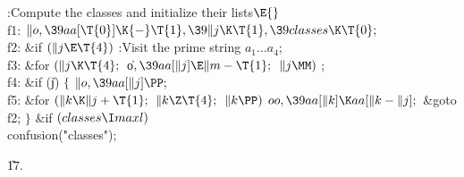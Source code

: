\Y\B\4:Compute the classes and initialize their lists\X${}\E{}$\6
\4\\{f1}:\5
${}\|o,\39\\{aa}[\T{0}]\K{-}\T{1},\39\|j\K\T{1},\39\\{classes}\K\T{0};{}$\6
\4\\{f2}:\5
\&{if} ${}(\|j\E\T{4}){}$\1\5
:Visit the prime string $a_1\ldots a_4$\X;\2\6
\4\\{f3}:\5
\&{for} ${}(\|j\K\T{4};{}$ \|o${},\39\\{aa}[\|j]\E\|m-\T{1};{}$ ${}\|j\MM){}$\1%
\5
;\2\6
\4\\{f4}:\5
\&{if} (\|j)\5
${}\{{}$\1\6
${}\|o,\39\\{aa}[\|j]\PP;{}$\6
\4\\{f5}:\5
\&{for} ${}(\|k\K\|j+\T{1};{}$ ${}\|k\Z\T{4};{}$ ${}\|k\PP){}$\1\5
${}\\{oo},\39\\{aa}[\|k]\K\\{aa}[\|k-\|j];{}$\2\6
\&{goto} \\{f2};\6
\4${}\}{}$\2\6
\&{if} ${}(\\{classes}\I\\{maxl}){}$\1\5
\\{confusion}(\.{"classes"});\2\par
\U17.\fi


